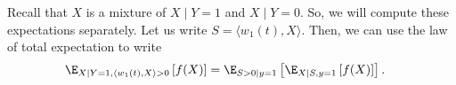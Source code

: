 \documentclass{article}
\begin{document}
Recall that $X$ is a mixture of $X \mid Y = 1$ and $X \mid Y = 0$.
So, we will compute these expectations separately.
Let us write $S = \langle w_1(t), X \rangle$.
Then, we can use the law of total expectation to write
\begin{align}
  \E_{X \mid Y = 1, \langle w_1(t), X \rangle > 0} \left[ f(X) \right]
  &= %
  \E_{S > 0 \mid y = 1} \left[ \E_{X \mid S, y = 1}\left[ f(X) \right] \right].
\end{align}
\end{document}
